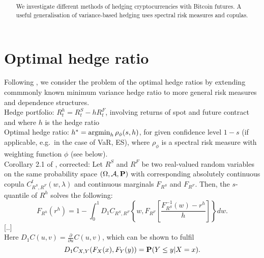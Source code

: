 \documentclass[square]{article} %
\theoremstyle{plain}
\theoremstyle{definition} %
\begin{document}
\setlength{\boxlength}{0.95\textwidth} %
\title{\large{\bf{}}} %
\author{{\normalsize\bf{}}}%
\thispagestyle{empty}
\addtocounter{page}{1}
\maketitle
\begin{abstract}
  We investigate different methods of hedging cryptocurrencies with
  Bitcoin futures. A useful generalisation of variance-based hedging
  uses spectral risk measures and copulas. 
\end{abstract}
\vspace{.5cm}
\def\contentsname{Contents}
\tableofcontents
\vspace{.5cm}

\section{Optimal hedge ratio}
\label{sec:optimal-hedge-ratio}

Following \citep{Barbi2014}, we consider the problem of the optimal
hedge ratios by extending commmonly known minimum variance hedge ratio
to more general risk measures and dependence structures.\medskip\\
Hedge portfolio: $R_t^h = R_t^S - h R_t^F$, involving returns of spot
and future contract and where $h$ is the hedge ratio\\
Optimal hedge ratio: $h^\ast = \argmin_h \rho_\phi(s,h)$, for given
confidence level $1-s$ (if applicable, e.g.\ in the case of VaR, ES),
where $\rho_\phi$ is a spectral risk measure with weighting function
$\phi$ (see below). \\ 
Corollary 2.1 of \citep{Barbi2014}, corrected: Let $R^S$ and $R^F$ be
two real-valued random variables on the same probability space
$(\Omega, \mathcal A, {\bf P})$ with corresponding absolutely continuous
copula $C^t_{R^S, R^F}(w,\lambda)$ and continuous marginals $F_{R^S}$
and $F_{R^F}$. Then, the $s$-quantile of $R^h$ solves the following:
\begin{equation*}
  F_{R^h}(r^h) = 1- \int^1_0 D_1 C_{R^S, R^F}
  \left\{ w, F_{R^F} \left[ \frac{F^{-1}_{R^S}(w)-r^h}{h} \right]
  \right\}dw.  
\end{equation*}
[..]\\
Here $D_1 C(u,v)=\displaystyle \frac{\partial}{\partial u} C(u,v)$,
which can be shown to fulfil \citep{Cherubini2011}
\begin{equation*}
  D_1 C_{X,Y}(F_X(x), F_Y(y)) = {\bf P}(Y\leq y|X=x).
\end{equation*}
\end{document}
